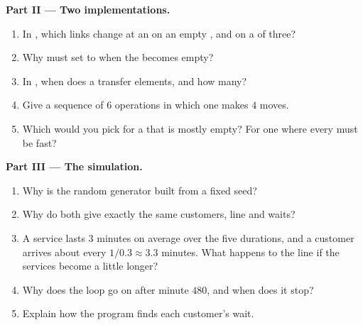 \begin{problem}
\medskip\noindent\textbf{Part II --- Two implementations.}
\begin{enumerate}[resume]
  \item In , which links change at an  on an empty , and on a  of three?
  \item Why must  set  to  when the  becomes empty?
  \item In , when does a  transfer elements, and how many?
  \item Give a sequence of $6$ operations in which one  makes $4$ moves.
  \item Which  would you pick for a  that is mostly empty? For one where every  must be
    fast?
\end{enumerate}

\medskip\noindent\textbf{Part III --- The simulation.}
\begin{enumerate}[resume]
  \item Why is the random generator built from a fixed seed?
  \item Why do both  give exactly the same customers, line and waits?
  \item A service lasts $3$ minutes on average over the five durations, and a customer arrives about every
    $1/0.3 \approx 3.3$ minutes. What happens to the line if the services become a little longer?
  \item Why does the loop go on after minute $480$, and when does it stop?
  \item Explain how the program finds each customer's wait.
\end{enumerate}


\end{problem}
